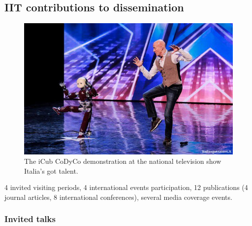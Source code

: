 \subsection{IIT contributions to dissemination}

\begin{figure}[!t]
	\begin{center}
		\includegraphics[width=.5\textwidth]{images/icub_igt.jpeg}		
		\caption{The iCub CoDyCo demonstration at the national television show Italia's got talent. }
		\label{fig:iCubIGT}
	\end{center}
\end{figure}

4 invited visiting periods, 4 international events participation, 12 publications (4 journal articles, 8 international conferences), several media coverage events.

\subsubsection{Invited talks}

